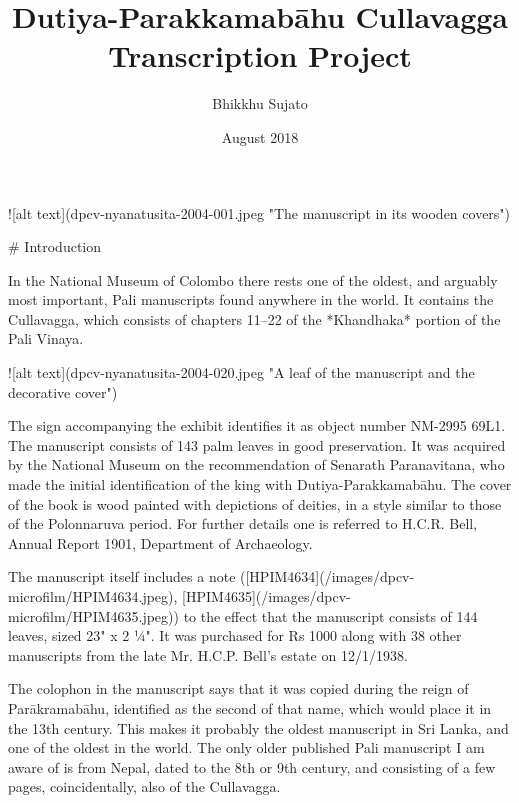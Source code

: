\documentclass[11pt, openany,a5paper]{article}
\title{Dutiya-Parakkamabāhu Cullavagga Transcription Project}
\author{Bhikkhu Sujato}
\date{August 2018}
\begin{document}
\maketitle

\thispagestyle{empty}

\begin{markdown}

![alt text](dpcv-nyanatusita-2004-001.jpeg "The manuscript in its wooden covers")

\end{markdown}

\newpage

\tableofcontents


\begin{markdown}


# Introduction

In the National Museum of Colombo there rests one of the oldest, and arguably most important, Pali manuscripts found anywhere in the world. It contains the Cullavagga, which consists of chapters 11–22 of the *Khandhaka* portion of the Pali Vinaya.

![alt text](dpcv-nyanatusita-2004-020.jpeg "A leaf of the manuscript and the decorative cover")

The sign accompanying the exhibit identifies it as object number NM-2995 69L1. The manuscript consists of 143 palm leaves in good preservation. It was acquired by the National Museum on the recommendation of Senarath Paranavitana, who made the initial identification of the king with Dutiya-Parakkamabāhu. The cover of the book is wood painted with depictions of deities, in a style similar to those of the Polonnaruva period. For further details one is referred to H.C.R. Bell, Annual Report 1901, Department of Archaeology.

The manuscript itself includes a note ([HPIM4634](/images/dpcv-microfilm/HPIM4634.jpeg), [HPIM4635](/images/dpcv-microfilm/HPIM4635.jpeg)) to the effect that the manuscript consists of 144 leaves, sized 23" x 2 ¼". It was purchased for Rs 1000 along with 38 other manuscripts from the late Mr. H.C.P. Bell’s estate on 12/1/1938.

The colophon in the manuscript says that it was copied during the reign of Parākramabāhu, identified as the second of that name, which would place it in the 13th century. This makes it probably the oldest manuscript in Sri Lanka, and one of the oldest in the world. The only older published Pali manuscript I am aware of is from Nepal, dated to the 8th or 9th century, and consisting of a few pages, coincidentally, also of the Cullavagga.


\end{markdown}
\end{document}
